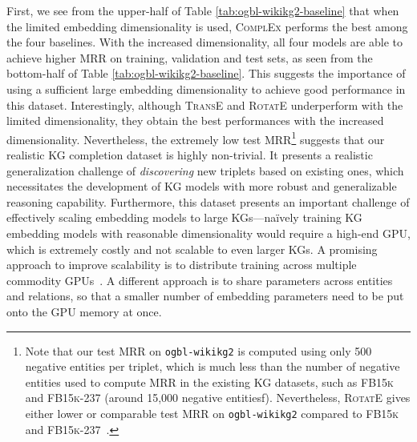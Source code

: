 {First, we see from the upper-half of Table \ref{tab:ogbl-wikikg2-baseline} that when the limited embedding dimensionality is used, \textsc{ComplEx} performs the best among the four baselines.
With the increased dimensionality, all four models are able to achieve higher MRR on training, validation and test sets, as seen from the bottom-half of Table \ref{tab:ogbl-wikikg2-baseline}. This suggests the importance of using a sufficient large embedding dimensionality to achieve good performance in this dataset.
Interestingly, although \textsc{TransE} and \textsc{RotatE} underperform with the limited dimensionality, they obtain the best performances with the increased dimensionality.
Nevertheless, the extremely low test MRR\footnote{Note that our test MRR on \texttt{ogbl-wikikg2} is computed using only 500 negative entities per triplet, which is much less than the number of negative entities used to compute MRR in the existing KG datasets, such as \textsc{FB15k} and \textsc{FB15k-237} (around 15,000 negative entitiesf).
Nevertheless, \textsc{RotatE} gives either lower or comparable test MRR on \texttt{ogbl-wikikg2} compared to \textsc{FB15k} and \textsc{FB15k-237}~\citep{sun2019rotate}.} suggests that our realistic KG completion dataset is highly non-trivial. It presents a realistic generalization challenge of \emph{discovering} new triplets based on existing ones, which necessitates the development of KG models with more robust and generalizable reasoning capability.
Furthermore, this dataset presents an important challenge of effectively scaling embedding models to large KGs---na\"ively training KG embedding models with reasonable dimensionality would require a high-end GPU, which is extremely costly and not scalable to even larger KGs. 
A promising approach to improve scalability is to distribute training across multiple commodity GPUs~\citep{zheng2020dgl,zhu2019graphvite,lerer2019pytorch}. A different approach is to share parameters across entities and relations, so that a smaller number of embedding parameters need to be put onto the GPU memory at once.
}

